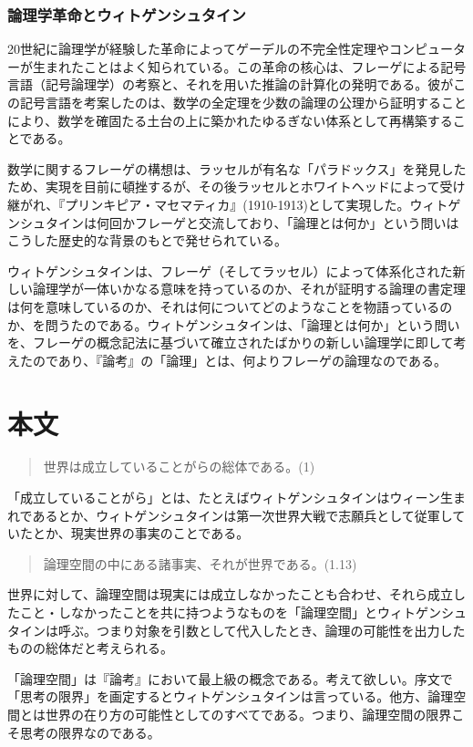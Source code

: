 \documentclass[a4paper,11pt]{jsarticle}
\begin{document}
\subsubsection{論理学革命とウィトゲンシュタイン}
20世紀に論理学が経験した革命によってゲーデルの不完全性定理やコンピューターが生まれたことはよく知られている。この革命の核心は、フレーゲによる記号言語（記号論理学）の考察と、それを用いた推論の計算化の発明である。彼がこの記号言語を考案したのは、数学の全定理を少数の論理の公理から証明することにより、数学を確固たる土台の上に築かれたゆるぎない体系として再構築することである。

数学に関するフレーゲの構想は、ラッセルが有名な「パラドックス」を発見したため、実現を目前に頓挫するが、その後ラッセルとホワイトヘッドによって受け継がれ、『プリンキピア・マセマティカ』(1910-1913)として実現した。ウィトゲンシュタインは何回かフレーゲと交流しており、「論理とは何か」という問いはこうした歴史的な背景のもとで発せられている。

ウィトゲンシュタインは、フレーゲ（そしてラッセル）によって体系化された新しい論理学が一体いかなる意味を持っているのか、それが証明する論理の書定理は何を意味しているのか、それは何についてどのようなことを物語っているのか、を問うたのである。ウィトゲンシュタインは、「論理とは何か」という問いを、フレーゲの概念記法に基づいて確立されたばかりの新しい論理学に即して考えたのであり、『論考』の「論理」とは、何よりフレーゲの論理なのである。


\section{本文}
\begin{quote}
世界は成立していることがらの総体である。(1)
\end{quote}
「成立していることがら」とは、たとえばウィトゲンシュタインはウィーン生まれであるとか、ウィトゲンシュタインは第一次世界大戦で志願兵として従軍していたとか、現実世界の事実のことである。

\begin{quote}
論理空間の中にある諸事実、それが世界である。(1.13)
\end{quote}

世界に対して、論理空間は現実には成立しなかったことも合わせ、それら成立したこと・しなかったことを共に持つようなものを「論理空間」とウィトゲンシュタインは呼ぶ。つまり対象を引数として代入したとき、論理の可能性を出力したものの総体だと考えられる。

「論理空間」は『論考』において最上級の概念である。考えて欲しい。序文で「思考の限界」を画定するとウィトゲンシュタインは言っている。他方、論理空間とは世界の在り方の可能性としてのすべてである。つまり、論理空間の限界こそ思考の限界なのである。
\end{document}
